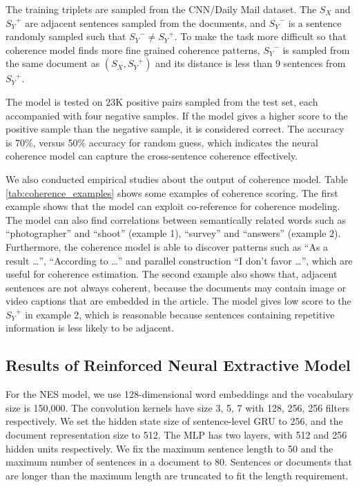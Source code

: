 \documentclass[letterpaper]{article} %
\begin{document}
	
	The training triplets are sampled from the CNN/Daily Mail dataset. The $S_X$ and ${S_Y}^{+}$ are adjacent sentences sampled from the documents, and ${S_Y}^{-}$ is a sentence randomly sampled such that ${S_Y}^{-} \neq {S_Y}^{+}$. To make the task more difficult so that coherence model finds more fine grained coherence patterns, ${S_Y}^{-}$ is sampled from the same document as $(S_X, {S_Y}^{+})$ and its distance is less than 9 sentences from ${S_Y}^{+}$.
	
	The model is tested on 23K positive pairs sampled from the test set, each accompanied with four negative samples. If the model gives a higher score to the positive sample than the negative sample, it is considered correct. The accuracy is 70\%, versus 50\% accuracy for random guess, which indicates the neural coherence model can capture the cross-sentence coherence effectively.
	
	We also conducted empirical studies about the output of coherence model. Table \ref{tab:coherence_examples} shows some examples of coherence scoring. The first example shows that the model can exploit co-reference for coherence modeling. The model can also find correlations between semantically related words such as ``photographer'' and ``shoot'' (example 1), ``survey'' and ``answers'' (example 2). Furthermore, the coherence model is able to discover patterns such as ``As a result \dots'', ``According to \dots'' and parallel construction ``I don't favor \dots'', which are useful for coherence estimation. The second example also shows that, adjacent sentences are not always coherent, because the documents may contain image or video captions that are embedded in the article. The model gives low score to the ${S_Y}^{+}$ in example 2, which is reasonable because sentences containing repetitive information is less likely to be adjacent.
	
	\subsection{Results of Reinforced Neural Extractive Model}
	For the NES model, we use 128-dimensional word embeddings and the vocabulary size is 150,000. The convolution kernels have size 3, 5, 7 with 128, 256, 256 filters respectively. We set the hidden state size of sentence-level GRU to 256, and the document representation size to 512. The MLP has two layers, with 512 and 256 hidden units respectively. We fix the maximum sentence length to 50 and the maximum number of sentences in a document to 80. Sentences or documents that are longer than the maximum length are truncated to fit the length requirement.
	
\end{document}
